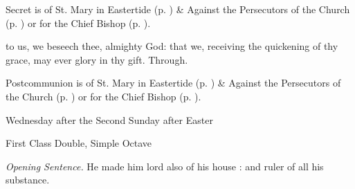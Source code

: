 \begin{rubric}
     Secret is of St. Mary in Eastertide (p. \pageref{SPMaryInEaster}) \&  Against the Persecutors of the Church (p. \pageref{SPAgainst}) or for the Chief Bishop (p. \pageref{SPChiefBishop}).
\end{rubric}
\postcommunion
{} to us, we beseech thee, almighty God: that we, receiving the quickening of thy grace, may ever glory in thy gift. Through.
\begin{rubric}
     Postcommunion is of St. Mary in Eastertide (p. \pageref{SPMaryInEaster}) \&  Against the Persecutors of the Church (p. \pageref{SPAgainst}) or for the Chief Bishop (p. \pageref{SPChiefBishop}).
\end{rubric}

\begin{inhead}
    {Wednesday after the Second Sunday after Easter}\par
    {First Class Double, Simple Octave}
\end{inhead}
\par\noindent
\textit{Opening Sentence.} He made him lord also of his house : and ruler of all his substance.



